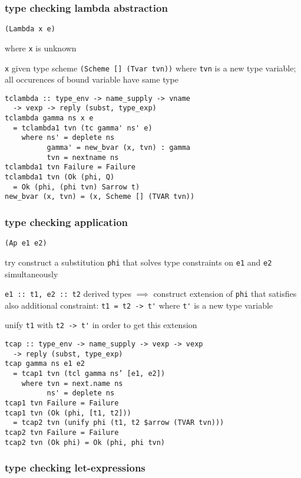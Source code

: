 \documentclass[8pt]{extarticle}
\begin{document}
\begin{multicols*}{2}
\subsubsection{type checking lambda abstraction}

\verb|(Lambda x e)|

where \verb|x| is unknown

\verb|x| given type scheme \verb|(Scheme [] (Tvar tvn))| where \verb|tvn| is a new type variable; all occurences of bound variable have same type

\begin{verbatim}
tclambda :: type_env -> name_supply -> vname
  -> vexp -> reply (subst, type_exp)
tclambda gamma ns x e
  = tclambda1 tvn (tc gamma' ns' e)
    where ns' = deplete ns
          gamma' = new_bvar (x, tvn) : gamma
          tvn = nextname ns
tclambda1 tvn Failure = Failure
tclambda1 tvn (Ok (phi, Q)
  = Ok (phi, (phi tvn) Sarrow t)
new_bvar (x, tvn) = (x, Scheme [] (TVAR tvn))
\end{verbatim}

\vfill\null
\columnbreak

\subsubsection{type checking application}

\verb|(Ap e1 e2)|

try construct a substitution \verb|phi| that solves type constraints on \verb|e1| and \verb|e2| simultaneously

\verb|e1 :: t1, e2 :: t2| derived types $\implies$ construct extension of \verb|phi| that satisfies also additional constraint: \verb|t1 = t2 -> t'| where \verb|t'| is a new type variable

unify \verb|t1| with \verb|t2 -> t'| in order to get this extension

\begin{verbatim}
tcap :: type_env -> name_supply -> vexp -> vexp
  -> reply (subst, type_exp)
tcap gamma ns e1 e2
  = tcap1 tvn (tcl gamma ns’ [e1, e2])
    where tvn = next.name ns
          ns' = deplete ns
tcap1 tvn Failure = Failure
tcap1 tvn (Ok (phi, [t1, t2]))
  = tcap2 tvn (unify phi (t1, t2 $arrow (TVAR tvn)))
tcap2 tvn Failure = Failure
tcap2 tvn (Ok phi) = Ok (phi, phi tvn)
\end{verbatim}

\vfill\null
\columnbreak

\subsubsection{type checking let-expressions}


\end{multicols*}
\end{document}
